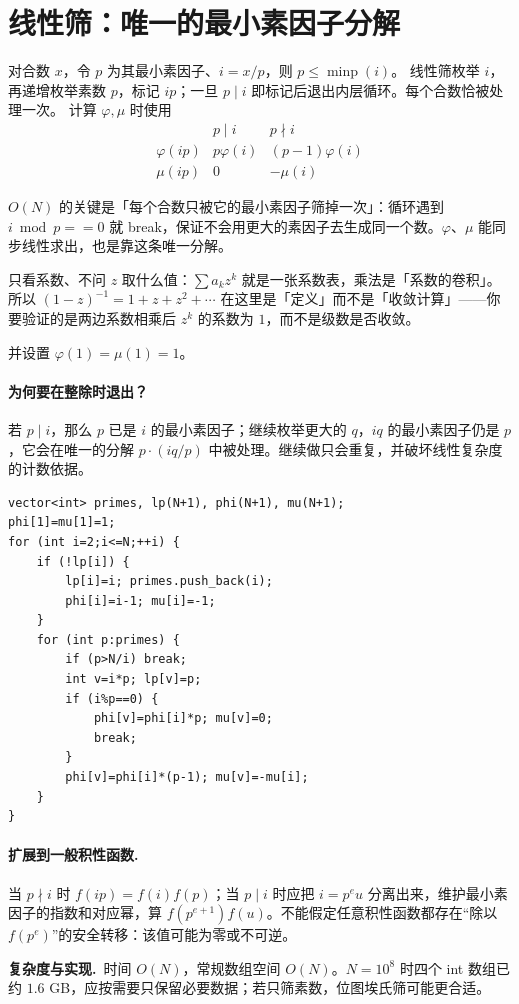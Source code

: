 \documentclass[UTF8,a4paper,11pt,twoside,openright,fontset=fandol]{ctexbook}
\theoremstyle{definition}
\newcommand{\cost}{\par\noindent\textbf{复杂度与实现.}\ }
\begin{document}
\section{线性筛：唯一的最小素因子分解}
对合数 $x$，令 $p$ 为其最小素因子、$i=x/p$，则 $p\le\operatorname{minp}(i)$。
线性筛枚举 $i$，再递增枚举素数 $p$，标记 $ip$；一旦 $p\mid i$ 即标记后退出内层循环。每个合数恰被处理一次。
计算 $\varphi,\mu$ 时使用
\[
\begin{array}{c|cc}
 &p\mid i&p\nmid i\\\hline
\varphi(ip)&p\varphi(i)&(p-1)\varphi(i)\\
\mu(ip)&0&-\mu(i)
\end{array}
\]

\begin{tip}
$O(N)$ 的关键是「每个合数只被它的最小素因子筛掉一次」：循环遇到 $i\bmod p==0$ 就 break，保证不会用更大的素因子去生成同一个数。$\varphi$、$\mu$ 能同步线性求出，也是靠这条唯一分解。
\end{tip}

\begin{tip}[「形式」两个字的含义]
只看系数、不问 $z$ 取什么值：$\sum a_kz^k$ 就是一张系数表，乘法是「系数的卷积」。所以 $(1-z)^{-1}=1+z+z^2+\cdots$ 在这里是「定义」而不是「收敛计算」——你要验证的是两边系数相乘后 $z^k$ 的系数为 $1$，而不是级数是否收敛。
\end{tip}

并设置 $\varphi(1)=\mu(1)=1$。


\paragraph{为何要在整除时退出？}
若 $p\mid i$，那么 $p$ 已是 $i$ 的最小素因子；继续枚举更大的 $q$，$iq$ 的最小素因子仍是 $p$，它会在唯一的分解 $p\cdot(iq/p)$ 中被处理。继续做只会重复，并破坏线性复杂度的计数依据。
\begin{lstlisting}
vector<int> primes, lp(N+1), phi(N+1), mu(N+1);
phi[1]=mu[1]=1;
for (int i=2;i<=N;++i) {
    if (!lp[i]) {
        lp[i]=i; primes.push_back(i);
        phi[i]=i-1; mu[i]=-1;
    }
    for (int p:primes) {
        if (p>N/i) break;
        int v=i*p; lp[v]=p;
        if (i%p==0) {
            phi[v]=phi[i]*p; mu[v]=0;
            break;
        }
        phi[v]=phi[i]*(p-1); mu[v]=-mu[i];
    }
}
\end{lstlisting}
\paragraph{扩展到一般积性函数.} 当 $p\nmid i$ 时 $f(ip)=f(i)f(p)$；当 $p\mid i$ 时应把 $i=p^e u$ 分离出来，维护最小素因子的指数和对应幂，算 $f(p^{e+1})f(u)$。不能假定任意积性函数都存在“除以 $f(p^e)$”的安全转移：该值可能为零或不可逆。
\cost 时间 $O(N)$，常规数组空间 $O(N)$。$N=10^8$ 时四个 int 数组已约 $1.6$ GB，应按需要只保留必要数据；若只筛素数，位图埃氏筛可能更合适。
\end{document}
